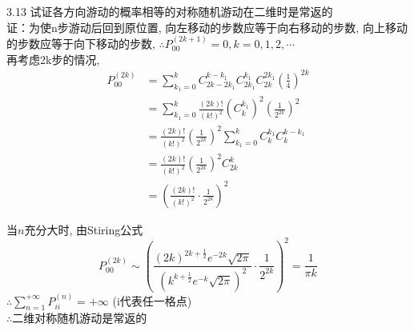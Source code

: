 3.13 试证各方向游动的概率相等的对称随机游动在二维时是常返的%
\\%
证：为使n步游动后回到原位置, 向左移动的步数应等于向右移动的步数, 向上移动的步数应等于向下移动的步数, $\therefore P^{(2k+1)}_{00} = 0, k = 0, 1, 2,\cdots$\\
再考虑2k步的情况, \\
\[
\begin{split}
P^{(2k)}_{00} & = \sum^k_{k_1 = 0}C^{k-k_1}_{2k-2k_1}C^{k_1}_{2k_1}C^{2k_1}_{2k}\left(\frac{1}{4}\right)^{2k}\\
			& = \sum^k_{k_1 = 0}\frac{(2k)!}{(k!)^2}\left(C^{k_1}_k\right)^2\left(\frac{1}{2^{2k}}\right)^2\\
            & = \frac{(2k)!}{(k!)^2}\left(\frac{1}{2^{2k}}\right)^2\sum^k_{k_1 = 0}C^{k_1}_kC^{k-k_1}_k\\
            & = \frac{(2k)!}{(k!)^2}\left(\frac{1}{2^{2k}}\right)^2C^{k}_{2k}\\
            & = \left(\frac{(2k)!}{(k!)^2} \cdot \frac{1}{2^{2k}}\right)^2
\end{split}
\]


当$n$充分大时, 由Stiring公式
\[
P^{(2k)}_{00} \sim \left(\frac{(2k)^{2k+\frac{1}{2}} e^{-2k} \sqrt{2\pi}}{(k^{k+\frac{1}{2}} e^{-k} \sqrt{2\pi})^2} \cdot \frac{1}{2^{2k}}\right)^2 = \frac{1}{\pi k}
\]
$\therefore \sum\limits^{+\infty}_{n=1}P^{(n)}_{ii} = +\infty$   (i代表任一格点)\\
$\therefore $二维对称随机游动是常返的\\


